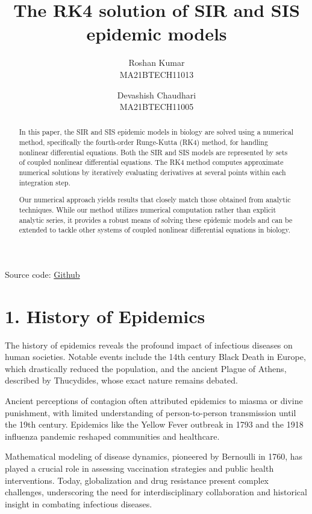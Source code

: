 \documentclass[10pt]{article}
\title{The RK4 solution of SIR and SIS epidemic models}
\author{
    Roshan Kumar \\
    MA21BTECH11013
    \and
    Devashish Chaudhari \\
    MA21BTECH11005
}
\date{}
\begin{document}
\maketitle

\begin{flushright}
Source code: \href{https://github.com/Numerologists/Using-Numerical-Methods-in-Finding-Solutions-of-Epidemic-Models}{Github}
\end{flushright}

\begin{abstract}
In this paper, the SIR and SIS epidemic models in biology are solved using a numerical method, specifically the fourth-order Runge-Kutta (RK4) method, for handling nonlinear differential equations. Both the SIR and SIS models are represented by sets of coupled nonlinear differential equations. The RK4 method computes approximate numerical solutions by iteratively evaluating derivatives at several points within each integration step.

Our numerical approach yields results that closely match those obtained from analytic techniques. While our method utilizes numerical computation rather than explicit analytic series, it provides a robust means of solving these epidemic models and can be extended to tackle other systems of coupled nonlinear differential equations in biology.
\end{abstract}


\section*{1. History of Epidemics}
The history of epidemics reveals the profound impact of infectious diseases on human societies. Notable events include the 14th century Black Death in Europe, which drastically reduced the population, and the ancient Plague of Athens, described by Thucydides, whose exact nature remains debated.

Ancient perceptions of contagion often attributed epidemics to miasma or divine punishment, with limited understanding of person-to-person transmission until the 19th century. Epidemics like the Yellow Fever outbreak in 1793 and the 1918 influenza pandemic reshaped communities and healthcare.

Mathematical modeling of disease dynamics, pioneered by Bernoulli in 1760, has played a crucial role in assessing vaccination strategies and public health interventions. Today, globalization and drug resistance present complex challenges, underscoring the need for interdisciplinary collaboration and historical insight in combating infectious diseases.
\end{document}
